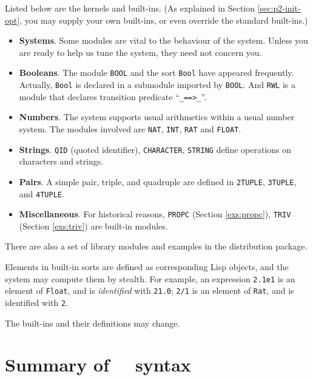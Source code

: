 \documentclass[a4paper]{memoir}
\begin{document}
Listed below are the kernels and built-ins.
(As explained in Section \ref{sec:p2-init-opt}, you may supply your
own built-ins, or even override the standard built-ins.)
\begin{itemize}
\item[] \textbf{ Systems}. Some modules are vital to the behaviour of
  the system. Unless you are ready to help us tune the system, they
  need not concern you.
\item[] \textbf{ Booleans}. The module \verb|BOOL| and the sort \verb|Bool|
  have appeared frequently. Actually, \verb|Bool| is declared in a
  submodule imported by \verb|BOOL|. And \verb|RWL| is a module that
  declares transition predicate ``\verb|_==>_|''.
\item[] \textbf{ Numbers}. The system supports usual arithmetics within
  a usual number system. The modules involved are
  \verb|NAT|, \verb|INT|, \verb|RAT| and \verb|FLOAT|.
\item[] \textbf{ Strings}. \verb|QID| (quoted identifier),
  \verb|CHARACTER|, \verb|STRING| define operations on characters
  and strings.
\item[] \textbf{ Pairs}. A simple pair, triple, and quadruple are defined
  in \verb|2TUPLE|, \verb|3TUPLE|, and \verb|4TUPLE|.
\item[] \textbf{ Miscellaneous}. For historical reasons, \verb|PROPC|
  (Section \ref{exs:propc}), \verb|TRIV| (Section \ref{exs:triv})
   are built-in modules.
\end{itemize}
There are also a set of library modules and examples in the
distribution package.

\begin{warning}
  Elements in built-in sorts are defined as corresponding Lisp objects,
  and the system may compute them by stealth. For example,
  an expression \verb|2.1e1| is an element of \verb|Float|, and
  is {\em identified} with \verb|21.0|; \verb|2/1| is an element of
  \verb|Rat|, and is identified with \verb|2|.
\end{warning}

\begin{warning}
  The built-ins and their definitions may change.
\end{warning}

\appendix
\chapter{Summary of \cafeobj~~syntax}
\end{document}
